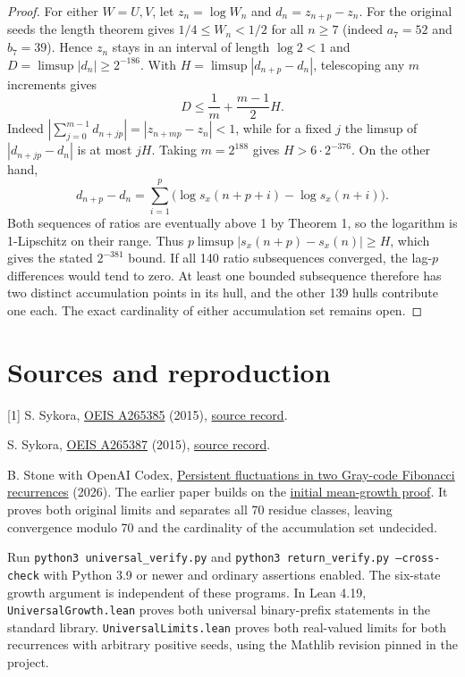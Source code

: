 \documentclass[11pt,letterpaper]{article}
\begin{document}
\begin{proof}
\newpage
For either $W=U,V$, let $z_n=\log W_n$ and $d_n=z_{n+p}-z_n$. For the original seeds the length theorem gives $1/4\le W_n<1/2$ for all $n\ge7$ (indeed $a_7=52$ and $b_7=39$). Hence $z_n$ stays in an interval of length $\log2<1$ and $D=\limsup|d_n|\ge2^{-186}$. With $H=\limsup|d_{n+p}-d_n|$, telescoping any $m$ increments gives
\[
 D\le \frac1m+\frac{m-1}{2} H.
\]
Indeed $|\sum_{j=0}^{m-1}d_{n+jp}|=|z_{n+mp}-z_n|<1$, while for a fixed $j$ the limsup of $|d_{n+jp}-d_n|$ is at most $jH$. Taking $m=2^{188}$ gives $H>6\cdot2^{-376}$. On the other hand,
\[
 d_{n+p}-d_n=
 \sum_{i=1}^p\bigl(\log s_x(n+p+i)-\log s_x(n+i)\bigr).
\]
Both sequences of ratios are eventually above 1 by Theorem 1, so the logarithm is 1-Lipschitz on their range. Thus $p\limsup|s_x(n+p)-s_x(n)|\ge H$, which gives the stated $2^{-381}$ bound. If all 140 ratio subsequences converged, the lag-$p$ differences would tend to zero. At least one bounded subsequence therefore has two distinct accumulation points in its hull, and the other 139 hulls contribute one each. The exact cardinality of either accumulation set remains open.
\end{proof}

\section*{Sources and reproduction}
\small
[1] S. Sykora, \href{https://oeis.org/A265385}{OEIS A265385} (2015), \href{https://github.com/oeis/oeisdata/blob/main/seq/A265/A265385.seq}{source record}.\par
[2] S. Sykora, \href{https://oeis.org/A265387}{OEIS A265387} (2015), \href{https://github.com/oeis/oeisdata/blob/main/seq/A265/A265387.seq}{source record}.\par
[3] B. Stone with OpenAI Codex, \href{https://github.com/blakestone-x/math/blob/c18014b822980b0d6cb9b78fc228e5efda2718c6/A265387/manuscript.pdf}{Persistent fluctuations in two Gray-code Fibonacci recurrences} (2026). The earlier paper builds on the \href{https://github.com/blakestone-x/math/tree/c18014b822980b0d6cb9b78fc228e5efda2718c6/A265385}{initial mean-growth proof}. It proves both original limits and separates all 70 residue classes, leaving convergence modulo 70 and the cardinality of the accumulation set undecided.\par
Run \texttt{python3 universal\_verify.py} and \texttt{python3 return\_verify.py --cross-check} with Python 3.9 or newer and ordinary assertions enabled. The six-state growth argument is independent of these programs. In Lean 4.19, \texttt{UniversalGrowth.lean} proves both universal binary-prefix statements in the standard library. \texttt{UniversalLimits.lean} proves both real-valued limits for both recurrences with arbitrary positive seeds, using the Mathlib revision pinned in the project.
\end{document}
